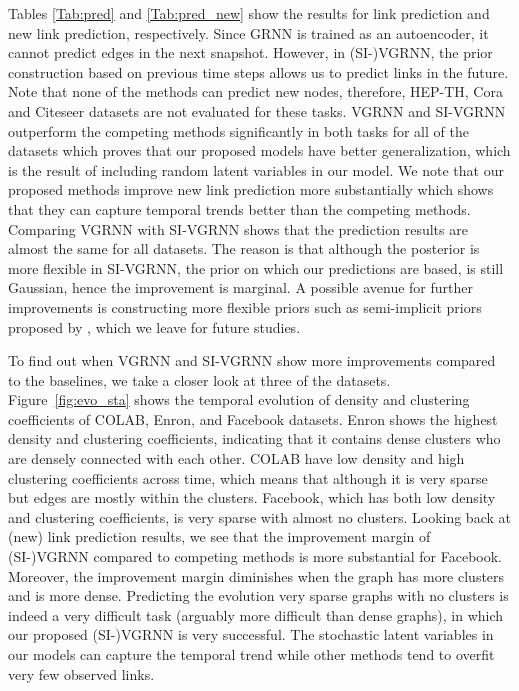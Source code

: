 \documentclass{article}
\begin{document}
\quad Tables \ref{Tab:pred} and \ref{Tab:pred_new} show the results for link prediction and new link prediction, respectively. Since GRNN is trained as an autoencoder, it cannot predict edges in the next snapshot. However, in (SI-)VGRNN, the prior construction based on previous time steps allows us to predict links in the future. Note that none of the methods can predict new nodes, therefore, HEP-TH, Cora and Citeseer datasets are not evaluated for these tasks. 
VGRNN and SI-VGRNN outperform the competing methods significantly in both tasks for all of the datasets which proves that our proposed models have better generalization, which is the result of including random latent variables in our model.
We note that our proposed methods improve new link prediction more substantially which shows that they can capture temporal trends better than the competing methods.
Comparing VGRNN with SI-VGRNN shows that the prediction results are almost the same for all datasets. The reason is that although the posterior is more flexible in SI-VGRNN, the prior on which our predictions are based, is still Gaussian, hence the improvement is marginal. A possible avenue for further improvements is constructing more flexible priors such as semi-implicit priors proposed by \citet{molchanov2018doubly}, which we leave for future studies.


To find out when VGRNN and SI-VGRNN show more improvements compared to the baselines, we take a closer look at three of the datasets. Figure~\ref{fig:evo_sta} shows the temporal evolution of density and clustering coefficients of COLAB, Enron, and Facebook datasets. Enron shows the highest density and clustering coefficients, indicating that it contains dense clusters who are densely connected with each other. COLAB have low density and high clustering coefficients across time, which means that although it is very sparse but edges are mostly within the clusters. Facebook, which has both low density and clustering coefficients, is very sparse with almost no clusters. Looking back at (new) link prediction results, we see that the improvement margin of (SI-)VGRNN compared to competing methods is more substantial for Facebook. Moreover, the improvement margin diminishes when the graph has more clusters and is more dense. Predicting the evolution very sparse graphs with no clusters is indeed a very difficult task (arguably more difficult than dense graphs), in which our proposed (SI-)VGRNN is very successful. The stochastic latent variables in our models can capture the temporal trend while other methods tend to overfit very few observed links.
\end{document}
